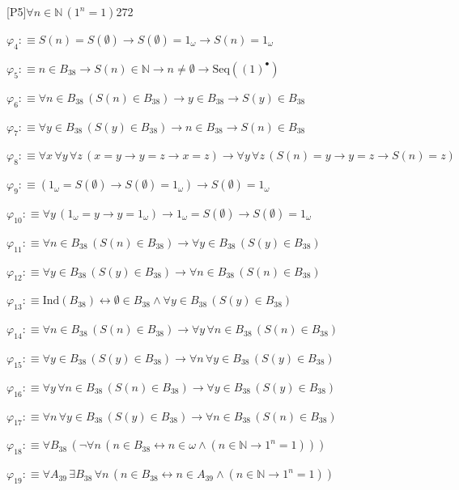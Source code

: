 \begin{fullproof}{[P5]}{$\forall n \in \mathbb{N}\,({{1}^{n}} = 1)$}{272}
\begin{abbrevlist}
\item $\varphi_{4} :\equiv S(n) = S(\emptyset) \to S(\emptyset) = 1_{\omega} \to S(n) = 1_{\omega}$
\item $\varphi_{5} :\equiv n \in B_{38} \to S(n) \in \mathbb{N} \to n \neq \emptyset \to \mathrm{Seq}({(1)^{\bullet}})$
\item $\varphi_{6} :\equiv \forall n \in B_{38}\,(S(n) \in B_{38}) \to y \in B_{38} \to S(y) \in B_{38}$
\item $\varphi_{7} :\equiv \forall y \in B_{38}\,(S(y) \in B_{38}) \to n \in B_{38} \to S(n) \in B_{38}$
\item $\varphi_{8} :\equiv \forall x\,\forall y\,\forall z\,(x = y \to y = z \to x = z) \to \forall y\,\forall z\,(S(n) = y \to y = z \to S(n) = z)$
\item $\varphi_{9} :\equiv (1_{\omega} = S(\emptyset) \to S(\emptyset) = 1_{\omega}) \to S(\emptyset) = 1_{\omega}$
\item $\varphi_{10} :\equiv \forall y\,(1_{\omega} = y \to y = 1_{\omega}) \to 1_{\omega} = S(\emptyset) \to S(\emptyset) = 1_{\omega}$
\item $\varphi_{11} :\equiv \forall n \in B_{38}\,(S(n) \in B_{38}) \to \forall y \in B_{38}\,(S(y) \in B_{38})$
\item $\varphi_{12} :\equiv \forall y \in B_{38}\,(S(y) \in B_{38}) \to \forall n \in B_{38}\,(S(n) \in B_{38})$
\item $\varphi_{13} :\equiv \mathrm{Ind}(B_{38}) \leftrightarrow \emptyset \in B_{38} \land \forall y \in B_{38}\,(S(y) \in B_{38})$
\item $\varphi_{14} :\equiv \forall n \in B_{38}\,(S(n) \in B_{38}) \to \forall y\,\forall n \in B_{38}\,(S(n) \in B_{38})$
\item $\varphi_{15} :\equiv \forall y \in B_{38}\,(S(y) \in B_{38}) \to \forall n\,\forall y \in B_{38}\,(S(y) \in B_{38})$
\item $\varphi_{16} :\equiv \forall y\,\forall n \in B_{38}\,(S(n) \in B_{38}) \to \forall y \in B_{38}\,(S(y) \in B_{38})$
\item $\varphi_{17} :\equiv \forall n\,\forall y \in B_{38}\,(S(y) \in B_{38}) \to \forall n \in B_{38}\,(S(n) \in B_{38})$
\item $\varphi_{18} :\equiv \forall B_{38}\,(\neg \forall n\,(n \in B_{38} \leftrightarrow n \in \omega \land (n \in \mathbb{N} \to {{1}^{n}} = 1)))$
\item $\varphi_{19} :\equiv \forall A_{39}\,\exists B_{38}\,\forall n\,(n \in B_{38} \leftrightarrow n \in A_{39} \land (n \in \mathbb{N} \to {{1}^{n}} = 1))$

\end{abbrevlist}
\end{fullproof}
